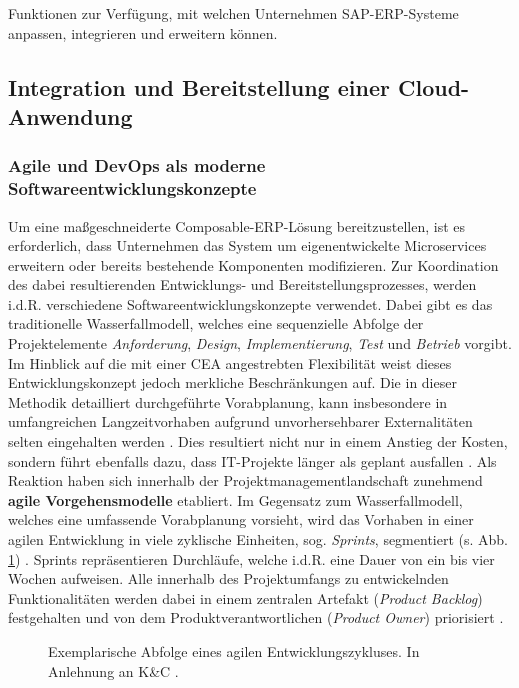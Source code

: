 Funktionen zur Verfügung, mit welchen Unternehmen SAP-ERP-Systeme anpassen, integrieren und erweitern können. 

\subsection{Integration und Bereitstellung einer Cloud-Anwendung}
\subsubsection{Agile und DevOps als moderne Softwareentwicklungskonzepte}
Um eine maßgeschneiderte Composable-ERP-Lösung bereitzustellen, ist es erforderlich, dass Unternehmen das System um eigenentwickelte Microservices erweitern oder bereits bestehende Komponenten modifizieren. Zur Koordination des dabei resultierenden Entwicklungs- und Bereitstellungsprozesses, werden i.d.R. verschiedene Softwareentwicklungskonzepte verwendet. Dabei gibt es das traditionelle Wasserfallmodell, welches eine sequenzielle Abfolge der Projektelemente \textit{Anforderung}, \textit{Design}, \textit{Implementierung}, \textit{Test} und \textit{Betrieb} vorgibt. Im Hinblick auf die mit einer CEA angestrebten Flexibilität weist dieses Entwicklungskonzept jedoch merkliche Beschränkungen auf. Die in dieser Methodik detailliert durchgeführte Vorabplanung, kann insbesondere in umfangreichen Langzeitvorhaben aufgrund unvorhersehbarer Externalitäten selten eingehalten werden \cite[5]{Vivenzio.2013}. Dies resultiert nicht nur in einem Anstieg der Kosten, sondern führt ebenfalls dazu, dass IT-Projekte länger als geplant ausfallen \cite[41]{Vieweg.2015}. Als Reaktion haben sich innerhalb der Projektmanagementlandschaft zunehmend \textbf{agile Vorgehensmodelle} etabliert.
Im Gegensatz zum Wasserfallmodell, welches eine umfassende Vorabplanung vorsieht, wird das Vorhaben in einer agilen Entwicklung in viele zyklische Einheiten, sog. \textit{Sprints}, segmentiert (s. Abb. \ref{fig:Agile_Cycle}) \cite[87]{Goll.2015}. Sprints repräsentieren Durchläufe, welche i.d.R. eine Dauer von ein bis vier Wochen aufweisen. Alle innerhalb des Projektumfangs zu entwickelnden Funktionalitäten werden dabei in einem zentralen Artefakt (\textit{Product Backlog}) festgehalten und von dem Produktverantwortlichen (\textit{Product Owner}) priorisiert \cite[196]{Gloger.2010}. 
\begin{center}
	\begin{figure}[H]
		\centering
		\caption[Exemplarische Abfolge eines agilen Entwicklungszykluses]{Exemplarische Abfolge eines agilen Entwicklungszykluses. In Anlehnung an K\&C \cite{K&C.2021}.}
		\label{fig:Agile_Cycle}
	\end{figure}	
\end{center}
